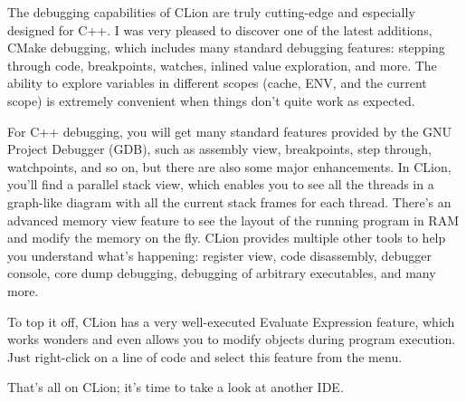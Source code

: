 
The debugging capabilities of CLion are truly cutting-edge and especially designed for C++. I was very pleased to discover one of the latest additions, CMake debugging, which includes many standard debugging features: stepping through code, breakpoints, watches, inlined value exploration, and more. The ability to explore variables in different scopes (cache, ENV, and the current scope) is extremely convenient when things don’t quite work as expected.

For C++ debugging, you will get many standard features provided by the GNU Project Debugger (GDB), such as assembly view, breakpoints, step through, watchpoints, and so on, but there are also some major enhancements. In CLion, you’ll find a parallel stack view, which enables you to see all the threads in a graph-like diagram with all the current stack frames for each thread.
There’s an advanced memory view feature to see the layout of the running program in RAM and modify the memory on the fly. CLion provides multiple other tools to help you understand what’s happening: register view, code disassembly, debugger console, core dump debugging, debugging of arbitrary executables, and many more.

To top it off, CLion has a very well-executed Evaluate Expression feature, which works wonders and even allows you to modify objects during program execution. Just right-click on a line of code and select this feature from the menu.

That’s all on CLion; it’s time to take a look at another IDE.




























